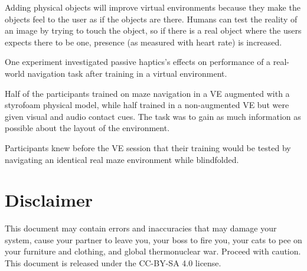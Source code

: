 \documentclass[a4paper]{article}
\begin{document}
Adding physical objects will improve virtual environments because they
make the objects feel to the user as if the objects are there.
Humans
can test the reality of an image by trying to touch the object, so if
there is a real object where the users expects there to be one, presence
(as measured with heart rate) is increased.

One experiment investigated passive haptics's effects on performance of
a real-world navigation task after training in a virtual environment.

Half of the participants trained on maze navigation in a VE augmented
with a styrofoam physical model, while half trained in a non-augmented
VE but were given visual and audio contact cues.
The task was to gain as
much information as possible about the layout of the environment.

Participants knew before the VE session that their training would be
tested by navigating an identical real maze environment while
blindfolded.

\section{Disclaimer}

This document may contain errors and inaccuracies that may damage your
system, cause your partner to leave you, your boss to fire you, your
cats to pee on your furniture and clothing, and global thermonuclear
war.
Proceed with caution.
This document is released under the CC-BY-SA 4.0 license.
\ccbysa
\end{document}
